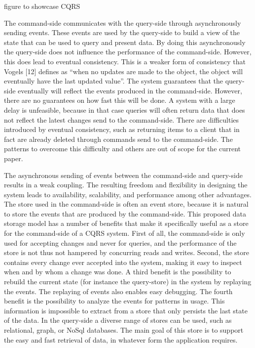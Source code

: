 figure to showcase CQRS

The command-side communicates with the query-side through asynchronously sending events. These events are used by the query-side to build a view of the state that can be used to query and present data. By doing this asynchronously the query-side does not influence the performance of the command-side. However, this does lead to eventual consistency. This is a weaker form of consistency that Vogels [12] defines as “when no updates are made to the object, the object will eventually have the last updated value”. The system guarantees that the query-side eventually will reflect the events produced in the command-side. However, there are no guarantees on how fast this will be done. A system with a large delay is unfeasible, because in that case queries will often return data that does not reflect the latest changes send to the command-side. There are difficulties introduced by eventual consistency, such as returning items to a client that in fact are already deleted through commands send to the command-side. The patterns to overcome this difficulty and others are out of scope for the current paper.

The asynchronous sending of events between the command-side and query-side results in a weak coupling. The resulting freedom and flexibility in designing the system leads to availability, scalability, and performance among other advantages. The store used in the command-side is often an event store, because it is natural to store the events that are produced by the command-side. This proposed data storage model has a number of benefits that make it specifically useful as a store for the command-side of a CQRS system. First of all, the command-side is only used for accepting changes and never for queries, and the performance of the store is not thus not hampered by concurring reads and writes. Second, the store contains every change ever accepted into the system, making it easy to inspect when and by whom a change was done. A third benefit is the possibility to rebuild the current state (for instance the query-store) in the system by replaying the events. The replaying of events also enables easy debugging. The fourth benefit is the possibility to analyze the events for patterns in usage. This information is impossible to extract from a store that only persists the last state of the data. In the query-side a diverse range of stores can be used, such as relational, graph, or NoSql databases. The main goal of this store is to support the easy and fast retrieval of data, in whatever form the application requires.


